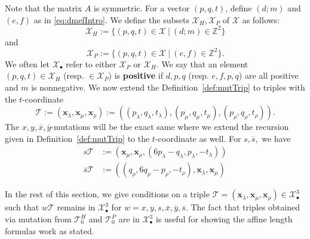 \documentclass[11pt, reqno]{amsart}
\theoremstyle{remark}
\numberwithin{equation}{subsection}
\numberwithin{figure}{section}
\theoremstyle{customremark}
\newcommand{\Tt}{\mathcal{T}}
\newcommand{\ov}{\overline}
\newcommand{\la}{{\lambda}}
\newcommand{\Z}{\mathbb{Z}}
\newcommand{\X}{\mathcal{X}}
\begin{document}
Note that the matrix $A$ is symmetric.
For a vector $(p,q,t) $, define $(d;m)$ and $(e,f)$ as in \eqref{eq:dmefIntro}.
We define the subsets $\X_H,\X_P$ of $\X$ as follows:  
\[\X_H:=\{ (p,q,t) \in \X \ | \ (d;m) \in \Z^2 \}
\]
and 
\[ \X_P:=\{ (p,q,t) \in \X \ | \ (e,f) \in \Z^2 \}.
\]
We often let $\X_\bullet$ refer to either $\X_P$ or $\X_H$. We say that an element $(p,q,t) \in \mathcal{X}_H$ (resp. $\in \mathcal{X}_P$) is {\bf positive} if $d, p,q$ (resp. $e,f,p,q$) are all positive and $m$ is nonnegative. We now extend the Definition~\ref{def:mutTrip} to triples with the $t$-coordinate \[\Tt:=(\bm{x}_\la,\bm{x}_\mu,\bm{x}_\rho):=((p_\la,q_\la,t_\la),(p_\mu,q_\mu,t_\mu),(p_\rho,q_\rho,t_\rho)).\] The $x,y,\ov{x},\ov{y}$-mutations will be the exact same where we extend the recursion given in Definition~\ref{def:mutTrip} to the $t$-coordinate as well. For $s,\ov{s},$ we have
\begin{align*}
    s\Tt&:=(\bm{x}_\mu,\bm{x}_\rho,(6p_\la-q_\la,p_\la,-t_\la))\\
    \ov{s}\Tt&:=((q_\rho,6q_\rho-p_\rho,-t_\rho),\bm{x}_\la,\bm{x}_\mu)
\end{align*}



In the rest of this section, we give conditions on a triple $\Tt=(\bm{x}_\la,\bm{x}_\mu,\bm{x}_\rho) \in \X^3_\bullet$ such that $w\Tt$ remains in $\X_\bullet^3$ for $w=x,y,s,\ov{x},\ov{y},\ov{s}$. The fact that triples obtained via mutation from $\Tt_0^H$ and $\Tt_0^P$ are in $\X_\bullet^3$ is useful for showing the affine length formulas work as stated. 
\end{document}
